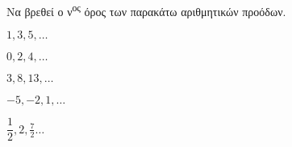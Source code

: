 Να βρεθεί ο ν\textsuperscript{ος} όρος των παρακάτω αριθμητικών προόδων.
\begin{multicols}{3}
\begin{alist}
\item $ 1,3,5,\ldots $
\item $ 0,2,4,\ldots $
\item $ 3,8,13,\ldots $
\item $ -5,-2,1,\ldots $
\item $ \dfrac{1}{2},2,\frac{7}{2}\ldots $
\end{alist}
\end{multicols}
